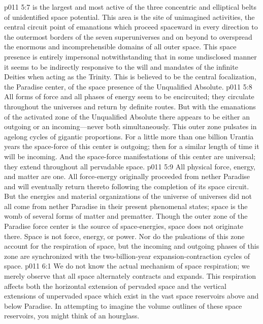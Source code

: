 \pc \vs p011 5:7  is the largest and most active of the three concentric and elliptical belts of unidentified space potential. This area is the site of unimagined activities, the central circuit point of emanations which proceed spaceward in every direction to the outermost borders of the seven superuniverses and on beyond to overspread the enormous and incomprehensible domains of all outer space. This space presence is entirely impersonal notwithstanding that in some undisclosed manner it seems to be indirectly responsive to the will and mandates of the infinite Deities when acting as the Trinity. This is believed to be the central focalization, the Paradise center, of the space presence of the Unqualified Absolute.
\vs p011 5:8 All forms of force and all phases of energy seem to be encircuited; they circulate throughout the universes and return by definite routes. But with the emanations of the activated zone of the Unqualified Absolute there appears to be either an outgoing or an incoming---never both simultaneously. This outer zone pulsates in agelong cycles of gigantic proportions. For a little more than one billion Urantia years the space\hyp{}force of this center is outgoing; then for a similar length of time it will be incoming. And the space\hyp{}force manifestations of this center are universal; they extend throughout all pervadable space.
\pc \vs p011 5:9 All physical force, energy, and matter are one. All force\hyp{}energy originally proceeded from nether Paradise and will eventually return thereto following the completion of its space circuit. But the energies and material organizations of the universe of universes did not all come from nether Paradise in their present phenomenal states; space is the womb of several forms of matter and prematter. Though the outer zone of the Paradise force center is the source of space\hyp{}energies, space does not originate there. Space is not force, energy, or power. Nor do the pulsations of this zone account for the respiration of space, but the incoming and outgoing phases of this zone are synchronized with the two\hyp{}billion\hyp{}year expansion\hyp{}contraction cycles of space.
\vs p011 6:1 We do not know the actual mechanism of space respiration; we merely observe that all space alternately contracts and expands. This respiration affects both the horizontal extension of pervaded space and the vertical extensions of unpervaded space which exist in the vast space reservoirs above and below Paradise. In attempting to imagine the volume outlines of these space reservoirs, you might think of an hourglass.
